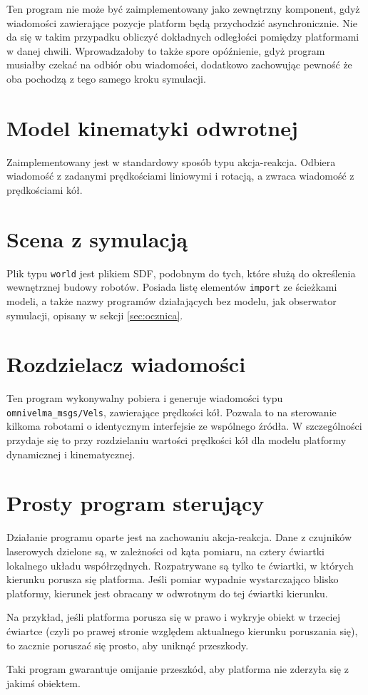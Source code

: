 	Ten program nie może być zaimplementowany jako zewnętrzny komponent, gdyż wiadomości zawierające pozycje platform będą przychodzić asynchronicznie.
	Nie da się w takim przypadku obliczyć dokładnych odległości pomiędzy platformami w danej chwili. 
	Wprowadzałoby to także spore opóźnienie, gdyż program musiałby czekać na odbiór obu wiadomości, dodatkowo zachowując pewność że oba pochodzą z tego samego kroku symulacji.
	
\section{Model kinematyki odwrotnej}
	Zaimplementowany jest w standardowy sposób typu akcja-reakcja.
	Odbiera wiadomość z zadanymi prędkościami liniowymi i rotacją, a zwraca wiadomość z prędkościami kół.
	
\section{Scena z symulacją}
	Plik typu \texttt{world} jest plikiem SDF, podobnym do tych, które służą do określenia wewnętrznej budowy robotów.
	Posiada listę elementów \texttt{import} ze ścieżkami modeli, a także nazwy programów działających bez modelu, jak obserwator symulacji, opisany w sekcji \ref{sec:ocznica}.

\section{Rozdzielacz wiadomości}
	Ten program wykonywalny pobiera i generuje wiadomości typu \texttt{omnivelma\_msgs/Vels}, zawierające prędkości kół.
	Pozwala to na sterowanie kilkoma robotami o identycznym interfejsie ze wspólnego źródła.
	W szczególności przydaje się to przy rozdzielaniu wartości prędkości kół dla modelu platformy dynamicznej i kinematycznej.

\section{Prosty program sterujący}
	Działanie programu oparte jest na zachowaniu akcja-reakcja.
	Dane z czujników laserowych dzielone są, w zależności od kąta pomiaru, na cztery ćwiartki lokalnego układu współrzędnych.
	Rozpatrywane są tylko te ćwiartki, w których kierunku porusza się platforma.
	Jeśli pomiar wypadnie wystarczająco blisko platformy, kierunek jest obracany w odwrotnym do tej ćwiartki kierunku.
	
	Na przykład, jeśli platforma porusza się w prawo i wykryje obiekt w trzeciej ćwiartce (czyli po prawej stronie względem aktualnego kierunku poruszania się),
	to zacznie poruszać się prosto, aby uniknąć przeszkody.
	
	Taki program gwarantuje omijanie przeszkód, aby platforma nie zderzyła się z jakimś obiektem.
